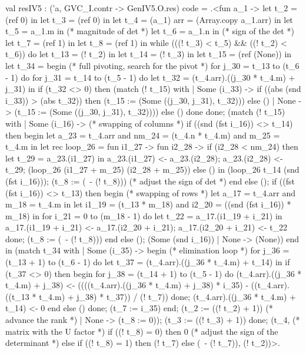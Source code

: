 \documentclass{elsart}
\begin{document}
\begin{code2}
val resIV5 : ('a, GVC_I.contr -> GenIV5.O.res) code =
  .<fun a_1 ->
   let t_2 = (ref 0) in
   let t_3 = (ref 0) in
   let t_4 = (a_1) {arr = (Array.copy a_1.arr)} in
   let t_5 = a_1.m in  (* magnitude of det *)
   let t_6 = a_1.n in  (* sign of the det *)
   let t_7 = (ref 1) in
   let t_8 = (ref 1) in
   while (((! t_3) < t_5) && ((! t_2) < t_6)) do
    let t_13 = (! t_2) in
    let t_14 = (! t_3) in
    let t_15 = (ref (None)) in
    let t_34 =
     begin (* full pivoting, search for the pivot *)
      for j_30 = t_13 to (t_6 - 1) do
       for j_31 = t_14 to (t_5 - 1) do
        let t_32 = (t_4.arr).((j_30 * t_4.m) + j_31) in
        if (t_32 <> 0) then
         (match (! t_15) with
          | Some (i_33) ->
             if ((abs (snd i_33)) > (abs t_32)) then
              (t_15 := (Some ((j_30, j_31), t_32)))
             else ()
          | None -> (t_15 := (Some ((j_30, j_31), t_32))))
        else ()
       done
      done;
      (match (! t_15) with
       | Some (i_16) -> (* swapping of columns *)
          if ((snd (fst i_16)) <> t_14) then begin
           let a_23 = t_4.arr
           and nm_24 = (t_4.n * t_4.m)
           and m_25 = t_4.m in
           let rec loop_26 =
            fun i1_27 ->
             fun i2_28 ->
              if (i2_28 < nm_24) then
               let t_29 = a_23.(i1_27) in
               a_23.(i1_27) <- a_23.(i2_28);
               a_23.(i2_28) <- t_29;
               (loop_26 (i1_27 + m_25) (i2_28 + m_25))
              else () in
           (loop_26 t_14 (snd (fst i_16)));
           (t_8 := (~- (! t_8))) (* adjust the sign of det *)
          end else ();
          if ((fst (fst i_16)) <> t_13) then begin (* swapping of rows *)
           let a_17 = t_4.arr and m_18 = t_4.m in
           let i1_19 = (t_13 * m_18) and i2_20 = ((snd (fst i_16)) * m_18) in
           for i_21 = 0 to (m_18 - 1) do
            let t_22 = a_17.(i1_19 + i_21) in
            a_17.(i1_19 + i_21) <- a_17.(i2_20 + i_21);
            a_17.(i2_20 + i_21) <- t_22
           done;
           (t_8 := (~- (! t_8)))
          end else ();
          (Some (snd i_16))
       | None -> (None))
     end in
    (match t_34 with
     | Some (i_35) ->
        begin (* elimination loop *)
         for j_36 = (t_13 + 1) to (t_6 - 1) do
          let t_37 = (t_4.arr).((j_36 * t_4.m) + t_14) in
          if (t_37 <> 0) then begin
           for j_38 = (t_14 + 1) to (t_5 - 1) do
            (t_4.arr).((j_36 * t_4.m) + j_38) <-
             ((((t_4.arr).((j_36 * t_4.m) + j_38) * i_35) -
                ((t_4.arr).((t_13 * t_4.m) + j_38) * t_37)) / (! t_7))
           done;
           (t_4.arr).((j_36 * t_4.m) + t_14) <- 0
          end else ()
         done;
         (t_7 := i_35)
        end;
        (t_2 := ((! t_2) + 1)) (* advance the rank *)
     | None -> (t_8 := 0));
    (t_3 := ((! t_3) + 1))
   done;
   (t_4, (* matrix with the U factor *)
    if ((! t_8) = 0) then 0 (* adjust the sign of the determinant *)
    else if ((! t_8) = 1) then (! t_7)
    else (~- (! t_7)), (! t_2))>.
\end{code2}
\end{document}
